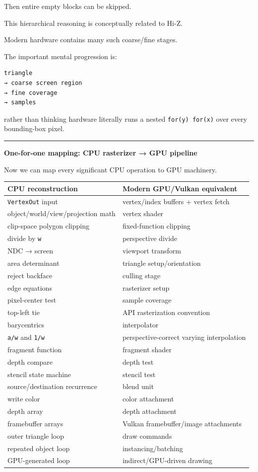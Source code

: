 Then entire empty blocks can be skipped.

This hierarchical reasoning is conceptually related to Hi-Z.

Modern hardware contains many such coarse/fine stages.

The important mental progression is:

\begin{verbatim}
triangle
→ coarse screen region
→ fine coverage
→ samples
\end{verbatim}

rather than thinking hardware literally runs a nested \texttt{for(y)\ for(x)} over every bounding-box pixel.

\begin{center}\rule{0.5\linewidth}{0.5pt}\end{center}

\textbf{One-for-one mapping: CPU rasterizer → GPU pipeline}

Now we can map every significant CPU operation to GPU machinery.

{\def\LTcaptype{none} %
\begin{longtable}[]{@{}ll@{}}
\toprule\noalign{}
CPU reconstruction & Modern GPU/Vulkan equivalent \\
\midrule\noalign{}
\endhead
\bottomrule\noalign{}
\endlastfoot
\texttt{VertexOut} input & vertex/index buffers + vertex fetch \\
object/world/view/projection math & vertex shader \\
clip-space polygon clipping & fixed-function clipping \\
divide by \texttt{w} & perspective divide \\
NDC → screen & viewport transform \\
area determinant & triangle setup/orientation \\
reject backface & culling stage \\
edge equations & rasterizer setup \\
pixel-center test & sample coverage \\
top-left tie & API rasterization convention \\
barycentrics & interpolator \\
\texttt{a/w} and \texttt{1/w} & perspective-correct varying interpolation \\
fragment function & fragment shader \\
depth compare & depth test \\
stencil state machine & stencil test \\
source/destination recurrence & blend unit \\
write color & color attachment \\
depth array & depth attachment \\
framebuffer arrays & Vulkan framebuffer/image attachments \\
outer triangle loop & draw commands \\
repeated object loop & instancing/batching \\
GPU-generated loop & indirect/GPU-driven drawing \\
\end{longtable}
}

